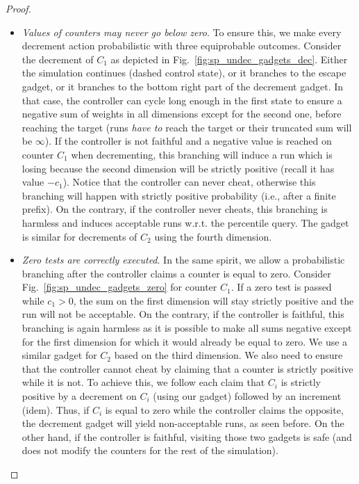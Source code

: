 \documentclass{llncs}
\begin{document}
\begin{proof}
\begin{itemize}
\item \textit{Values of counters may never go below zero}. To ensure this, we make every decrement action probabilistic with three equiprobable outcomes. Consider the decrement of $C_{1}$ as depicted in Fig.~\ref{fig:sp_undec_gadgets_dec}. Either the simulation continues (dashed control state), or it branches to the escape gadget, or it branches to the bottom right part of the decrement gadget. In that case, the controller can cycle long enough in the first state to ensure a negative sum of weights in all dimensions except for the second one, before reaching the target (runs \textit{have to} reach the target or their truncated sum will be $\infty$). If the controller is not faithful and a negative value is reached on counter $C_{1}$ when decrementing, this branching will induce a run which is losing because the second dimension will be strictly positive (recall it has value $-c_{1}$). Notice that the controller can never cheat, otherwise this branching will happen with strictly positive probability (i.e., after a finite prefix). On the contrary, if the controller never cheats, this branching is harmless and induces acceptable runs w.r.t. the percentile query. The gadget is similar for decrements of $C_{2}$ using the fourth dimension.

\item \textit{Zero tests are correctly executed}. In the same spirit, we allow a probabilistic branching after the controller claims a counter is equal to zero. Consider Fig.~\ref{fig:sp_undec_gadgets_zero} for counter $C_{1}$. If a zero test is passed while $c_{1} > 0$, the sum on the first dimension will stay strictly positive and the run will not be acceptable. On the contrary, if the controller is faithful, this branching is again harmless as it is possible to make all sums negative except for the first dimension for which it would already be equal to zero. We use a similar gadget for $C_{2}$ based on the third dimension. We also need to ensure that the controller cannot cheat by claiming that a counter is strictly positive while it is not. To achieve this, we follow each claim that $C_i$ is strictly positive by a decrement on $C_i$ (using our gadget) followed by an increment (idem). Thus, if $C_i$ is equal to zero while the controller claims the opposite, the decrement gadget will yield non-acceptable runs, as seen before. On the other hand, if the controller is faithful, visiting those two gadgets is safe (and does not modify the counters for the rest of the simulation).


\end{itemize}
\end{proof}
\end{document}
